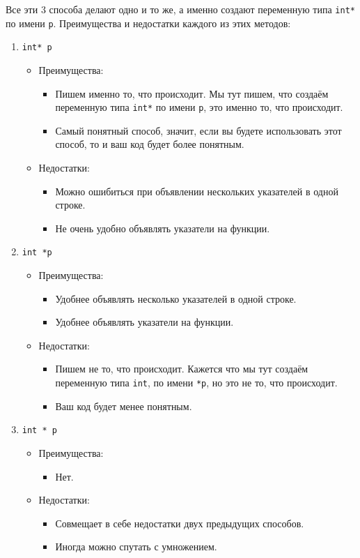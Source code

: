 \documentclass[10pt]{article}
\begin{document}
Все эти 3 способа делают одно и то же, а именно создают переменную типа \texttt{int*} по имени \texttt{p}. Преимущества и недостатки каждого из этих методов:
\begin{enumerate}
\item \texttt{int* p}
\begin{itemize}
\item Преимущества:
\begin{itemize}
\item Пишем именно то, что происходит. Мы тут пишем, что создаём переменную типа  \texttt{int*}  по имени \texttt{p}, это именно то, что происходит.
\item Самый понятный способ, значит, если вы будете использовать этот способ, то и ваш код будет более понятным.
\end{itemize}

\item Недостатки:
\begin{itemize}
\item Можно ошибиться при объявлении нескольких указателей в одной строке.
\item Не очень удобно объявлять указатели на функции.
\end{itemize}
\end{itemize}


\item \texttt{int *p}
\begin{itemize}
\item Преимущества:
\begin{itemize}
\item Удобнее объявлять несколько указателей в одной строке.
\item Удобнее объявлять указатели на функции.
\end{itemize}

\item Недостатки:
\begin{itemize}
\item Пишем не то, что происходит. Кажется что мы тут создаём переменную типа \texttt{int}, по имени \texttt{*p}, но это не то, что происходит.
\item Ваш код будет менее понятным.
\end{itemize}
\end{itemize}


\item \texttt{int * p}
\begin{itemize}
\item Преимущества:
\begin{itemize}
\item Нет.
\end{itemize}

\item Недостатки:
\begin{itemize}
\item Совмещает в себе недостатки двух предыдущих способов.
\item Иногда можно спутать с умножением.
\end{itemize}
\end{itemize}

\end{enumerate}
\end{document}

